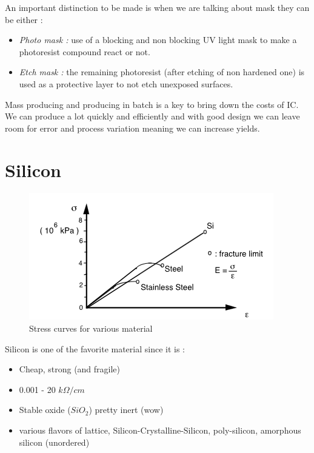 \documentclass{report}
\begin{document}
An important distinction to be made is when we are talking about mask they can be either : 

\begin{itemize}
    \item \textit{Photo mask :} use of a blocking and non blocking UV light mask to make a photoresist compound react or not.
    \item \textit{Etch mask :} the remaining photoresist (after etching of non hardened one) is used as a protective layer to not etch unexposed surfaces.
\end{itemize}

Mass producing and producing in batch is a key to bring down the costs of IC. We can produce a lot quickly and efficiently and with good design we can leave room for error and process variation meaning we can increase yields.

\section{Silicon}

\begin{figure}
  \begin{center}
    \includegraphics[width=0.95\linewidth]{resistivity_Si.png}
  \end{center}
  \caption{Stress curves for various material}
  \label{resistivity_Si}
\end{figure}

Silicon is one of the favorite material since it is :

\begin{itemize}
    \item Cheap, strong (and fragile)
    \item 0.001 - 20 $k\Omega/cm$
    \item Stable oxide ($SiO_2$) pretty inert (wow)
    \item various flavors of lattice, Silicon-Crystalline-Silicon, poly-silicon, amorphous silicon (unordered)
\end{itemize}
\end{document}
